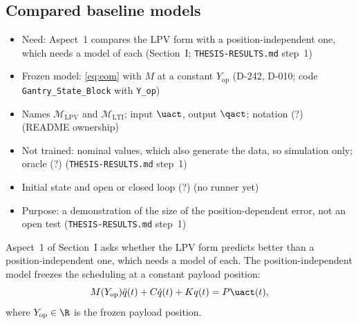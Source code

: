 \subsection{Compared baseline models}\label{sec:baseline_models}
\ifdraft
\begin{itemize}
\item Need: Aspect~1 compares the LPV form with a position-independent one, which needs a model of each (Section~I; \texttt{THESIS-RESULTS.md} step~1)
\item Frozen model: \eqref{eq:eom} with $M$ at a constant $Y_{\mathrm{op}}$ (D-242, D-010; code \texttt{Gantry\_State\_Block} with \texttt{Y\_op})
\item Names $\mathcal M_{\mathrm{LPV}}$ and $\mathcal M_{\mathrm{LTI}}$; input $\uact$, output $\qact$; notation (?) (README ownership)
\item Not trained: nominal values, which also generate the data, so simulation only; oracle (?) (\texttt{THESIS-RESULTS.md} step~1)
\item Initial state and open or closed loop (?) (no runner yet)
\item Purpose: a demonstration of the size of the position-dependent error, not an open test (\texttt{THESIS-RESULTS.md} step~1)
\end{itemize}
\fi

Aspect~1 of Section~I asks whether the LPV form predicts better than a
position-independent one, which needs a model of each.
The position-independent model freezes the scheduling at a constant payload
position:
\begin{equation}
  M(Y_{\mathrm{op}})\ddot{q}(t) + C\dot{q}(t) + K q(t) = P\uact(t),
  \label{eq:lti}
\end{equation}
where $Y_{\mathrm{op}}\in\R$ is the frozen payload position.

